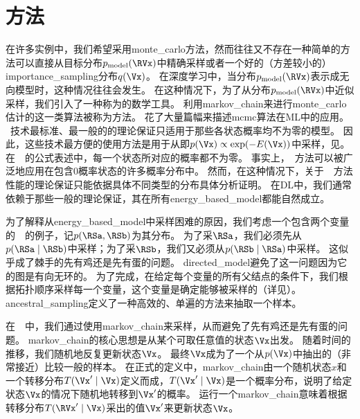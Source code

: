 \section{方法}
\label{sec:markov_chain_monte_carlo_methods}

在许多实例中，我们希望采用\gls{monte_carlo}方法，然而往往又不存在一种简单的方法可以直接从目标分布$p_{\text{model}}(\RVx)$中精确采样或者一个好的（方差较小的）\gls{importance_sampling}分布$q(\Vx)$。 
在深度学习中，当分布$p_{\text{model}}(\RVx)$表示成无向模型时，这种情况往往会发生。
在这种情况下，为了从分布$p_{\text{model}}(\RVx)$中近似采样，我们引入了一种称为的数学工具。
利用\gls{markov_chain}来进行\gls{monte_carlo}估计的这一类算法被称为方法。
\citet{Koller-Friedman-2009}花了大量篇幅来描述\gls{mcmc}算法在\gls{ML}中的应用。
~技术最标准、最一般的的理论保证只适用于那些各状态概率均不为零的模型。
因此，这些技术最方便的使用方法是用于从即$p(\Vx)\propto \exp(-E(\Vx))$中采样，见。
在~~的公式表述中，每一个状态所对应的概率都不为零。
事实上，~方法可以被广泛地应用在包含$0$概率状态的许多概率分布中。
然而，在这种情况下，关于~~方法性能的理论保证只能依据具体不同类型的分布具体分析证明。
在\gls{DL}中，我们通常依赖于那些一般的理论保证，其在所有\gls{energy_based_model}都能自然成立。



为了解释从\gls{energy_based_model}中采样困难的原因，我们考虑一个包含两个变量的~~的例子，记$p(\RSa,\RSb)$为其分布。  
为了采$\RSa$，我们必须先从$p(\RSa\mid \RSb)$中采样；为了采$\RSb$，我们又必须从$p(\RSb\mid \RSa)$中采样。   
这似乎成了棘手的先有鸡还是先有蛋的问题。
\gls{directed_model}避免了这一问题因为它的图是有向无环的。
为了完成，在给定每个变量的所有父结点的条件下，我们根据拓扑顺序采样每一个变量，这个变量是确定能够被采样的（详见）。   
\gls{ancestral_sampling}定义了一种高效的、单遍的方法来抽取一个样本。   


在~~中，我们通过使用\gls{markov_chain}来采样，从而避免了先有鸡还是先有蛋的问题。  
\gls{markov_chain}的核心思想是从某个可取任意值的状态$\Vx$出发。
随着时间的推移，我们随机地反复更新状态$\Vx$。  
最终$\Vx$成为了一个从$p(\Vx)$中抽出的（非常接近）比较一般的样本。  %
在正式的定义中，\gls{markov_chain}由一个随机状态$x$和一个转移分布$T(\Vx'\mid \Vx)$定义而成，$T(\Vx'\mid \Vx)$是一个概率分布，说明了给定状态$\Vx$的情况下随机地转移到$\Vx'$的概率。
运行一个\gls{markov_chain}意味着根据转移分布$T(\RVx' \mid \Vx)$采出的值$\Vx'$来更新状态$\Vx$。  


